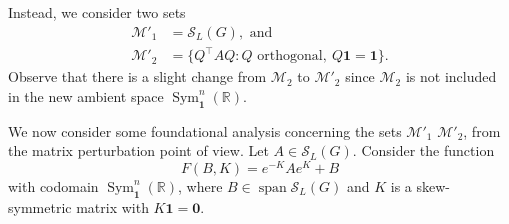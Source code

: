 \documentclass{article}
\theoremstyle{definition}
\newcommand{\trans}{^\top}
\newcommand{\bzero}{\mathbf{0}}
\newcommand{\bone}{\mathbf{1}}
\newcommand{\vspan}{\operatorname{span}}
\newcommand{\msymz}[1][n]{\operatorname{Sym}_{\bone}^{#1}(\mathbb{R})}
\newcommand{\mptn}{\mathcal{S}}
\begin{document}
Instead, we consider two sets
\[
    \begin{aligned}
        \mathcal{M}'_1 &= \mptn_L(G), \text{ and } \\
        \mathcal{M}'_2 &= \{Q\trans AQ: Q \text{ orthogonal},\ Q\bone = \bone\}.
    \end{aligned}
\]
Observe that there is a slight change from $\mathcal{M}_2$ to $\mathcal{M}'_2$ since $\mathcal{M}_2$ is not included in the new ambient space $\msymz$.  

We now consider some foundational analysis concerning the sets 
 $\mathcal{M}'_1$ 
        $\mathcal{M}'_2$, from the matrix perturbation point of view.  Let $A\in\mptn_L(G)$.  Consider the function  
\begin{equation}
\label{eq:perturb}
    F(B, K) = e^{-K}Ae^{K} + B    
\end{equation}
with codomain $\msymz$, where $B \in \vspan\mptn_L(G)$ and $K$ is a skew-symmetric matrix with $K\bone = \bzero$.  
\end{document}
